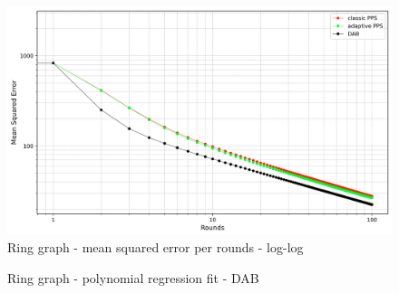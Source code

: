 \begin{figure}[]
    \centering
    \includegraphics[width=\linewidth]{figures/Simulation_outcomes/RingGraph/DAB_vs_PPS_RG_r100_n1024_averaged_loglog.png}
    \caption{Ring graph - mean squared error per rounds - log-log}
    \label{fig:ringgraphMSEperRoundLogLog}
\end{figure}
\begin{figure}[]
    \centering
    \caption{Ring graph - polynomial regression fit - DAB}
    \label{fig:dabRingModelFit}
\end{figure}
